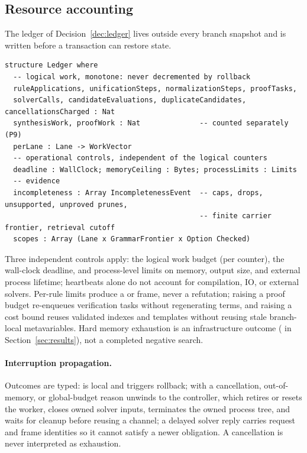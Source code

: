 \subsection{Resource accounting}\label{alg:ledger}

The ledger of Decision~\ref{dec:ledger} lives outside every branch snapshot and is written before a transaction can restore state.
\begin{lstlisting}
structure Ledger where
  -- logical work, monotone: never decremented by rollback
  ruleApplications, unificationSteps, normalizationSteps, proofTasks,
  solverCalls, candidateEvaluations, duplicateCandidates, cancellationsCharged : Nat
  synthesisWork, proofWork : Nat              -- counted separately (P9)
  perLane : Lane -> WorkVector
  -- operational controls, independent of the logical counters
  deadline : WallClock; memoryCeiling : Bytes; processLimits : Limits
  -- evidence
  incompleteness : Array IncompletenessEvent  -- caps, drops, unsupported, unproved prunes,
                                              -- finite carrier frontier, retrieval cutoff
  scopes : Array (Lane x GrammarFrontier x Option Checked)
\end{lstlisting}
Three independent controls apply: the logical work budget (per counter), the wall-clock deadline, and process-level limits on memory, output size, and external process lifetime; heartbeats alone do not account for compilation, IO, or external solvers. Per-rule limits produce a  or  frame, never a refutation; raising a proof budget re-enqueues verification tasks without regenerating terms, and raising a cost bound reuses validated indexes and templates without reusing stale branch-local metavariables. Hard memory exhaustion is an infrastructure outcome ( in Section~\ref{sec:results}), not a completed negative search.

\paragraph{Interruption propagation.} Outcomes are typed:  is local and triggers rollback;  with a cancellation, out-of-memory, or global-budget reason unwinds to the controller, which retires or resets the worker, closes owned solver inputs, terminates the owned process tree, and waits for cleanup before reusing a channel; a delayed solver reply carries request and frame identities so it cannot satisfy a newer obligation. A cancellation is never interpreted as exhaustion.

